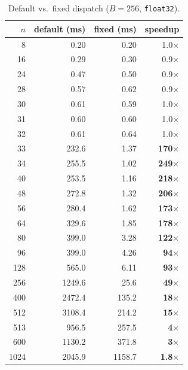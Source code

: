 \documentclass[10pt, letterpaper]{article}
\begin{document}
\begin{table}[h]
\centering
\caption{Default vs.\ fixed dispatch ($B = 256$, \texttt{float32}).}
\label{tab:f32_B256}
\begin{tabular}{r rrr}
\toprule
$n$ & default (ms) & fixed (ms) & speedup \\
\midrule
     8  &    0.20 &    0.20 & 1.0$\times$ \\
    16  &    0.29 &    0.30 & 0.9$\times$ \\
    24  &    0.47 &    0.50 & 0.9$\times$ \\
    28  &    0.57 &    0.62 & 0.9$\times$ \\
    30  &    0.61 &    0.59 & 1.0$\times$ \\
    31  &    0.60 &    0.60 & 1.0$\times$ \\
    32  &    0.61 &    0.64 & 1.0$\times$ \\
\midrule
    33  &   232.6 &    1.37 & \textbf{170$\times$} \\
    34  &   255.5 &    1.02 & \textbf{249$\times$} \\
    40  &   253.5 &    1.16 & \textbf{218$\times$} \\
    48  &   272.8 &    1.32 & \textbf{206$\times$} \\
    56  &   280.4 &    1.62 & \textbf{173$\times$} \\
    64  &   329.6 &    1.85 & \textbf{178$\times$} \\
    80  &   399.0 &    3.28 & \textbf{122$\times$} \\
    96  &   399.0 &    4.26 & \textbf{94$\times$} \\
   128  &   565.0 &    6.11 & \textbf{93$\times$} \\
   256  &  1249.6 &    25.6 & \textbf{49$\times$} \\
   400  &  2472.4 &   135.2 & \textbf{18$\times$} \\
   512  &  3108.4 &   214.2 & \textbf{15$\times$} \\
   513  &   956.5 &   257.5 & \textbf{4$\times$} \\
   600  &  1130.2 &   371.8 & \textbf{3$\times$} \\
  1024  &  2045.9 &  1158.7 & \textbf{1.8$\times$} \\
\bottomrule
\end{tabular}
\end{table}
\end{document}
